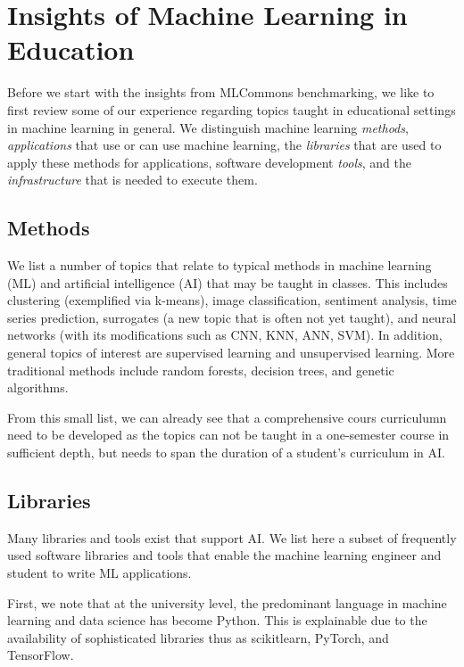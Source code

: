 \documentclass[utf8]{FrontiersinVancouver} %
\begin{document}
\section{Insights of Machine Learning in Education}
\label{sec:edu-ml}

Before we start with the insights from MLCommons benchmarking, we like
to first review some of our experience regarding topics taught in
educational settings in machine learning in general. We distinguish
machine learning {\em methods}, {\em applications} that use or can use
machine learning, the {\em libraries} that are used to apply these
methods for applications, software development {\em tools}, and the
{\em infrastructure} that is needed to execute them.

\subsection{Methods}

We list a number of topics that relate to typical methods in machine
learning (ML) and artificial intelligence (AI) that may be taught in
classes. This includes clustering (exemplified via k-means), image
classification, sentiment analysis, time series prediction, surrogates
(a new topic that is often not yet taught), and neural networks (with
its modifications such as CNN, KNN, ANN, SVM).  In addition, general
topics of interest are supervised learning and unsupervised learning.
More traditional methods include random forests, decision trees, and
genetic algorithms.

From this small list, we can already see that a comprehensive cours
curriculumn need to be developed as the topics can not be taught in a
one-semester course in sufficient depth, but needs to span the
duration of a student's curriculum in AI.

\subsection{Libraries}

Many libraries and tools exist that support AI.  We list here a subset
of frequently used software libraries and tools that enable the
machine learning engineer and student to write ML applications.

First, we note that at the university level, the predominant language
in machine learning and data science has become Python. This is
explainable due to the availability of sophisticated libraries thus as
scikitlearn, PyTorch, and TensorFlow.
\end{document}
